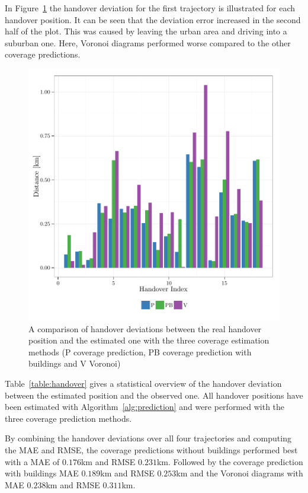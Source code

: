 In Figure~\ref{fig:handoverdeviation} the handover deviation for the first trajectory is illustrated for each handover position. It can be seen that the deviation error increased in the second half of the plot. This was caused by leaving the urban area and driving into a suburban one. Here, Voronoi diagrams performed worse compared to the other coverage predictions.

\begin{figure}[h!]
		\label{fig:handoverdeviation}
		\caption{ A comparison of handover deviations between the real handover position and the estimated one with the three coverage estimation methods (P coverage prediction, PB coverage prediction with buildings and V Voronoi)
		}
		\includegraphics[width=0.9\columnwidth]{images/563_HandoverDeviation}
	\end{figure}

Table~\ref{table:handover} gives a statistical overview of the handover deviation between the estimated position and the observed one. All handover positions have been estimated with Algorithm~\ref{alg:prediction} and were performed with the three coverage prediction methods. 

By combining the handover deviations over all four trajectories and computing the MAE and RMSE, the coverage predictions without buildings performed best with a MAE of $0.176$km and RMSE $0.231$km. Followed by the coverage prediction with buildings MAE $0.189$km and RMSE $0.253$km and the Voronoi diagrams with MAE $0.238$km and RMSE $0.311$km.

